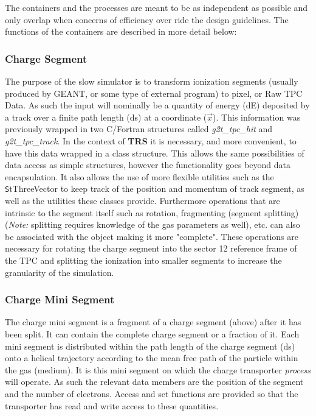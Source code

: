 \documentclass{article}
\begin{document}
The containers and the processes are meant to be as independent
as possible and only overlap when concerns of efficiency over ride
the design guidelines.  The functions of the containers are described
in more detail below:

\subsubsection{Charge Segment}
\label{sec:chargeSegment}

The purpose of the slow simulator is to transform ionization
segments (usually produced by GEANT, or some type of external program)
to pixel, or Raw TPC Data.  As such the input will nominally
be a quantity of energy (dE) deposited by a track over a finite
path length (ds) at a coordinate ($\vec{x}$).  This information was
previously wrapped in two C/Fortran structures called {\em g2t\_tpc\_hit}
and {\em g2t\_tpc\_track}.  In the context of {\bf TRS} it is necessary, and
more convenient, to have this data wrapped in a class structure.  This
allows the same possibilities of data access as simple structures, however
the functionality goes beyond data encapsulation.  It also allows the
use of more flexible utilities such as the {\texttt StThreeVector} to
keep track of the position and momentum of track segment, as well as the
utilities these classes provide.  Furthermore operations that are
intrinsic to the segment itself such as rotation, fragmenting
(segment splitting) ({\em Note:} splitting requires knowledge
of the gas parameters as well), etc. can also be associated with
the object making
it more "complete".  These operations are necessary for rotating the
charge segment into the sector 12 reference frame of the TPC and
splitting the ionization into smaller segments to increase the granularity
of the simulation.

\subsubsection{Charge Mini Segment}
\label{sec:chargeMiniSegment}

The charge mini segment is a fragment of a charge segment (above) after it
has been split.  It can contain the complete charge segment or a 
fraction of it.  Each mini segment is distributed within the path length
of the charge segment (ds) onto a helical trajectory according to
the mean free path of the particle within the gas (medium).  
It is this mini segment on which
the charge transporter {\em process} will operate.  As such the relevant
data members are the position of the segment and the number of electrons.
Access and set functions are provided so that the transporter has read and
write access to these quantities.  
\end{document}
